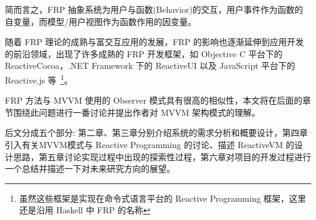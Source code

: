 简而言之，FRP 抽象系统为用户与函数(Behavior)的交互，用户事件作为函数的自变量，而模型/用户视图作为函数作用的因变量。

随着 FRP 理论的成熟与富交互应用的发展，FRP 的影响也逐渐延伸到应用开发的前沿领域，出现了许多成熟的 FRP 开发框架，如 Objective C 平台下的 ReactiveCocoa，.NET Framework 下的 ReactiveUI 以及 JavaScript 平台下的 Reactive.js 等~\footnote{虽然这些框架是实现在命令式语言平台的 Reactive Programming 框架，这里还是沿用 Haskell 中 FRP 的名称}。

FRP 方法与 MVVM 使用的 Observer 模式具有很高的相似性，本文将在后面的章节围绕此问题进行一番讨论并提出作者对 MVVM 架构模式的理解。

后文分成五个部分: 第二章、第三章分别介绍系统的需求分析和概要设计，第四章引入有关MVVM模式与 Reactive Programming 的讨论、描述 ReactiveVM 的设计思路，第五章讨论实现过程中出现的探索性过程，第六章对项目的开发过程进行一个总结并描述一下对未来研究方向的展望。

